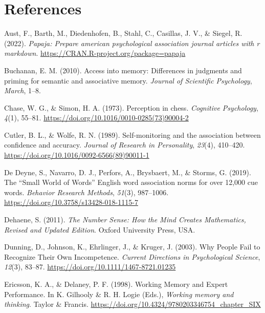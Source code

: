 \documentclass[
  man,floatsintext]{apa7}
\newlength{\cslhangindent}
\newenvironment{CSLReferences}[2] %
 {\begin{list}{}{%
  \setlength{\itemindent}{0pt}
  \setlength{\leftmargin}{0pt}
  \setlength{\parsep}{0pt}
  \ifodd #1
   \setlength{\leftmargin}{\cslhangindent}
   \setlength{\itemindent}{-1\cslhangindent}
  \fi
  \setlength{\itemsep}{#2\baselineskip}}}
 {\end{list}}
\begin{document}
\newpage

\section{References}\label{references}

\setlength{\parindent}{-0.5in}
\setlength{\leftskip}{0.5in}

\label{refs}
\begin{CSLReferences}{1}{0}
Aust, F., Barth, M., Diedenhofen, B., Stahl, C., Casillas, J. V., \& Siegel, R. (2022). \emph{Papaja: Prepare american psychological association journal articles with r markdown}. \url{https://CRAN.R-project.org/package=papaja}

Buchanan, E. M. (2010). {Access into memory: Differences in judgments and priming for semantic and associative memory}. \emph{Journal of Scientific Psychology}, \emph{March}, 1--8.

Chase, W. G., \& Simon, H. A. (1973). {Perception in chess}. \emph{Cognitive Psychology}, \emph{4}(1), 55--81. \url{https://doi.org/10.1016/0010-0285(73)90004-2}

Cutler, B. L., \& Wolfe, R. N. (1989). {Self-monitoring and the association between confidence and accuracy}. \emph{Journal of Research in Personality}, \emph{23}(4), 410--420. \url{https://doi.org/10.1016/0092-6566(89)90011-1}

De Deyne, S., Navarro, D. J., Perfors, A., Brysbaert, M., \& Storms, G. (2019). The {``}Small World of Words{''} English word association norms for over 12,000 cue words. \emph{Behavior Research Methods}, \emph{51}(3), 987--1006. \url{https://doi.org/10.3758/s13428-018-1115-7}

Dehaene, S. (2011). \emph{The Number Sense: How the Mind Creates Mathematics, Revised and Updated Edition}. Oxford University Press, USA.

Dunning, D., Johnson, K., Ehrlinger, J., \& Kruger, J. (2003). {Why People Fail to Recognize Their Own Incompetence}. \emph{Current Directions in Psychological Science}, \emph{12}(3), 83--87. \url{https://doi.org/10.1111/1467-8721.01235}

Ericsson, K. A., \& Delaney, P. F. (1998). {Working Memory and Expert Performance}. In K. Gilhooly \& R. H. Logie (Eds.), \emph{Working memory and thinking}. Taylor {\&} Francis. \url{https://doi.org/10.4324/9780203346754_chapter_SIX}


\end{CSLReferences}
\end{document}
